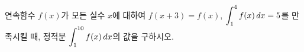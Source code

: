 연속함수 $f(x)$가 모든 실수 $x$에 대하여 $f(x+3)=f(x)$, $\displaystyle\int_{1}^{4}f(x)\mkern3mu dx=5$를 만족시킬 때, 정적분 $\displaystyle\int_{1}^{10}f(x)\mkern3mu dx$의 값을 구하시오.
